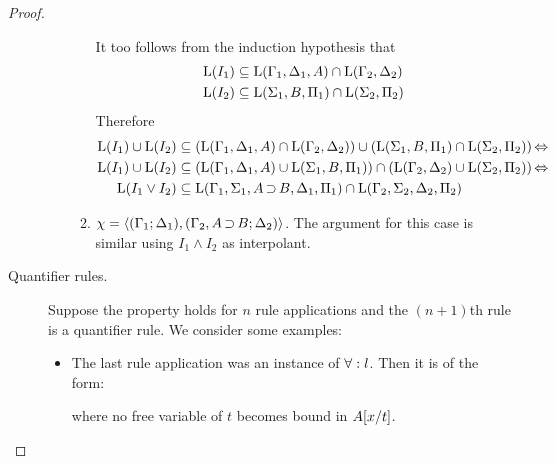 \begin{proof}
\begin{description}
\begin{itemize}
\begin{enumerate}
							{


								It too follows from the induction hypothesis that
								\begin{align*}
									\operatorname{L}(I_1) &\subseteq \operatorname{L}(\Gamma_1, \Delta_1, A) \cap \operatorname{L}(\Gamma_2, \Delta_2) \\
									\operatorname{L}(I_2) &\subseteq \operatorname{L}(\Sigma_1, B, \Pi_1) \cap \operatorname{L}(\Sigma_2, \Pi_2)
								\end{align*}
								Therefore
								\begin{align*}
									\operatorname{L}(I_1) \cup \operatorname{L}(I_2) &\subseteq
									(\operatorname{L}(\Gamma_1, \Delta_1, A) \cap \operatorname{L}(\Gamma_2, \Delta_2)) \cup ( \operatorname{L}(\Sigma_1, B, \Pi_1) \cap \operatorname{L}(\Sigma_2, \Pi_2)) \operatorname{\Leftrightarrow} \\
									\operatorname{L}(I_1) \cup \operatorname{L}(I_2) &\subseteq
									(\operatorname{L}(\Gamma_1, \Delta_1, A) \cup \operatorname{L}(\Sigma_1, B, \Pi_1)) \cap (\operatorname{L}(\Gamma_2, \Delta_2) \cup \operatorname{L}(\Sigma_2, \Pi_2)) \operatorname{\Leftrightarrow} \\
									\operatorname{L}(I_1 \lor I_2) &\subseteq \operatorname{L}(\Gamma_1, \Sigma_1, A\operatorname{\supset} B, \Delta_1, \Pi_1) \cap \operatorname{L}(\Gamma_2, \Sigma_2, \Delta_2, \Pi_2)
								\end{align*}

							}

						\item $\chi =  \langle (\Gamma_1; \Delta_1), (\Gamma_2, A\operatorname{\supset} B; \Delta_2)\rangle $.
							The argument for this case is similar using $I_1 \land I_2$ as interpolant.
					\end{enumerate}

			\end{itemize}

		\item[\normalfont Quantifier rules.]
			Suppose the property holds for $n$ rule applications and the $(n+1)$th rule is a quantifier rule.
			We consider some examples:

			\begin{itemize}
				\item The last rule application was an instance of $\forall:l$. Then it is of the form:
					\begin{prooftree}
					\end{prooftree}
					where no free variable of $t$ becomes bound in $A[x/t]$.


\end{itemize}
\end{description}
\end{proof}
